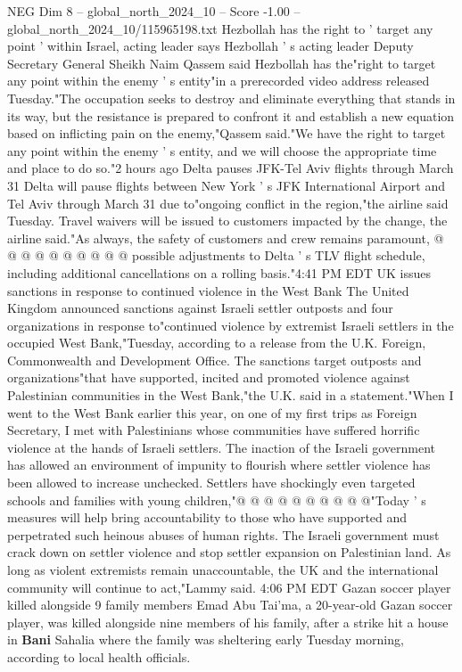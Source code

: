 \begin{textsample}{NEG Dim 8 – global\_north\_2024\_10 – Score -1.00 – global\_north\_2024\_10/115965198.txt}  \label{ex:f8_neg_299}
Hezbollah has the right to ' target any point ' within Israel, acting leader says Hezbollah ' s acting leader Deputy Secretary General Sheikh Naim Qassem said Hezbollah has the"right to target any point within the enemy ' s entity"in a prerecorded video address released Tuesday."The occupation seeks to destroy and eliminate everything that stands in its way, but the resistance is prepared to confront it and establish a new equation based on inflicting pain on the enemy,"Qassem said."We have the right to target any point within the enemy ' s entity, and we will choose the appropriate time and place to do so."2 hours ago Delta pauses JFK-Tel Aviv flights through March 31 Delta will pause flights between New York ' s JFK International Airport and Tel Aviv through March 31 due to"ongoing conflict in the region,"the airline said Tuesday.
Travel waivers will be issued to customers impacted by the change, the airline said."As always, the safety of customers and crew remains paramount, @ @ @ @ @ @ @ @ @ @ possible adjustments to Delta ' s TLV flight schedule, including additional cancellations on a rolling basis."4:41 PM EDT UK issues sanctions in response to continued violence in the West Bank The United Kingdom announced sanctions against Israeli settler outposts and four organizations in response to"continued violence by extremist Israeli settlers in the occupied West Bank,"Tuesday, according to a release from the U.K.
Foreign, Commonwealth and Development Office.
The sanctions target outposts and organizations"that have supported, incited and promoted violence against Palestinian communities in the West Bank,"the U.K. said in a statement."When I went to the West Bank earlier this year, on one of my first trips as Foreign Secretary, I met with Palestinians whose communities have suffered horrific violence at the hands of Israeli settlers.
The inaction of the Israeli government has allowed an environment of impunity to flourish where settler violence has been allowed to increase unchecked.
Settlers have shockingly even targeted schools and families with young children,"@ @ @ @ @ @ @ @ @ @"Today ' s measures will help bring accountability to those who have supported and perpetrated such heinous abuses of human rights.
The Israeli government must crack down on settler violence and stop settler expansion on Palestinian land.
As long as violent extremists remain unaccountable, the UK and the international community will continue to act,"Lammy said. 4:06 PM EDT Gazan soccer player killed alongside 9 family members Emad Abu Tai'ma, a 20-year-old Gazan soccer player, was killed alongside nine members of his family, after a strike hit a house in \textbf{Bani} Sahalia where the family was sheltering early Tuesday morning, according to local health officials.

\end{textsample}
